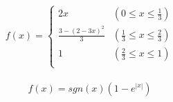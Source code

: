 \documentclass[a4d]{jarticle}
\begin{document}
\begin{eqnarray}
  f(x) = \left\{ \begin{array}{ll}
  2x & (0 \le x \le \frac{1}{3}) \\
  \frac{3 - (2 - 3x)^2}{3} & (\frac{1}{3} \le x \le \frac{2}{3}) \\
  1 & (\frac{2}{3} \le x \le 1) \\
\end{array} \right.
\end{eqnarray} 

\begin{eqnarray}
  f(x) = sgn(x) (1 - e^{|x|})
\end{eqnarray} 
\end{document}
